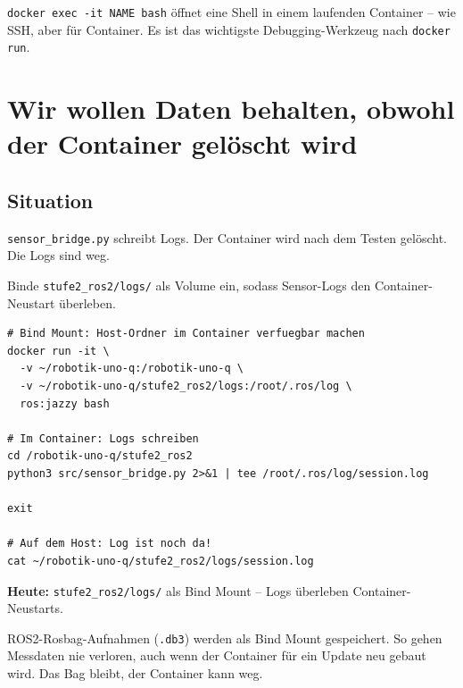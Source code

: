 \begin{merksatzBox}
\texttt{docker exec -it NAME bash} öffnet eine Shell
in einem laufenden Container -- wie SSH, aber für Container.
Es ist das wichtigste Debugging-Werkzeug nach \texttt{docker run}.
\end{merksatzBox}

\chapter{Wir wollen Daten behalten, obwohl der Container gelöscht wird}

\kapitelstruktur

\section{Situation}

\texttt{sensor\_bridge.py} schreibt Logs.
Der Container wird nach dem Testen gelöscht.
Die Logs sind weg.

\begin{aufgabeBox}
Binde \texttt{stufe2\_ros2/logs/} als Volume ein, sodass
Sensor-Logs den Container-Neustart überleben.
\end{aufgabeBox}

\begin{lstlisting}[style=bash]
# Bind Mount: Host-Ordner im Container verfuegbar machen
docker run -it \
  -v ~/robotik-uno-q:/robotik-uno-q \
  -v ~/robotik-uno-q/stufe2_ros2/logs:/root/.ros/log \
  ros:jazzy bash

# Im Container: Logs schreiben
cd /robotik-uno-q/stufe2_ros2
python3 src/sensor_bridge.py 2>&1 | tee /root/.ros/log/session.log

exit

# Auf dem Host: Log ist noch da!
cat ~/robotik-uno-q/stufe2_ros2/logs/session.log
\end{lstlisting}

\begin{projektBox}
\textbf{Heute:} \texttt{stufe2\_ros2/logs/} als Bind Mount --
Logs überleben Container-Neustarts.
\end{projektBox}

\begin{robotikBox}
ROS2-Rosbag-Aufnahmen (\texttt{.db3}) werden als Bind Mount
gespeichert. So gehen Messdaten nie verloren, auch wenn der
Container für ein Update neu gebaut wird.
Das Bag bleibt, der Container kann weg.
\end{robotikBox}

